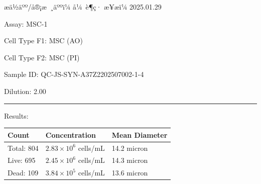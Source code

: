 \documentclass[UTF8,10pt,a4paper,fontset=fandol]{ctexart}
\newcommand{\fieldvalue}[1]{#1}
\newcommand{\handwritten}[1]{#1}
\begin{document}
\begin{center}
\begin{center}
\vfill

\noindent
æä½äºº/å®¡æ ¸äººï¼
\fieldvalue{\handwritten{å¼ è¶ç·}}
\hfill
æ¥æï¼
\fieldvalue{\handwritten{2025.01.29}}

\newpage

\noindent
Assay:
\fieldvalue{MSC-1}

\medskip
\noindent
Cell Type F1:
\fieldvalue{MSC (AO)}

\noindent
Cell Type F2:
\fieldvalue{MSC (PI)}

\medskip
\noindent
Sample ID:
\fieldvalue{QC-JS-SYN-A37Z2202507002-1-4}

\noindent
Dilution:
\fieldvalue{2.00}

\medskip
\noindent\rule{\textwidth}{0.4pt}

\noindent Results:

\medskip
\small
\begin{tabularx}{\textwidth}{@{}>{\raggedright\arraybackslash}X
                              >{\raggedright\arraybackslash}X
                              >{\raggedright\arraybackslash}X@{}}
\textbf{Count} & \textbf{Concentration} & \textbf{Mean Diameter} \\[-2pt]
\hline
\fieldvalue{Total: 804}
&
\fieldvalue{$2.83\times10^{6}$ cells/mL}
&
\fieldvalue{14.2 micron}
\\
\fieldvalue{Live: 695}
&
\fieldvalue{$2.45\times10^{6}$ cells/mL}
&
\fieldvalue{14.3 micron}
\\
\fieldvalue{Dead: 109}
&
\fieldvalue{$3.84\times10^{5}$ cells/mL}
&
\fieldvalue{13.6 micron}
\end{tabularx}


\end{center}
\end{center}
\end{document}
